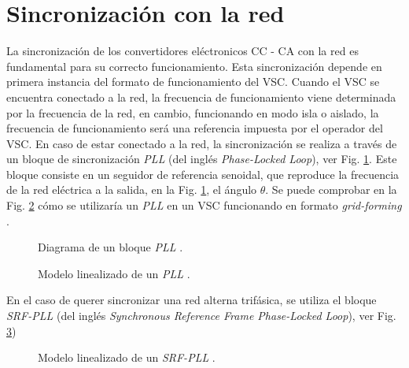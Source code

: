 \documentclass{report}
\begin{document}
\clearpage
\section{Sincronización con la red} \label{sec.sincronizacionconlared}

La sincronización de los convertidores eléctronicos CC - CA con la red es fundamental para su correcto funcionamiento. Esta sincronización depende en primera instancia del formato de funcionamiento del VSC. Cuando el VSC se encuentra conectado a la red, la frecuencia de funcionamiento viene determinada por la frecuencia de la red, en cambio, funcionando en modo isla o aislado, la frecuencia de funcionamiento será una referencia impuesta por el operador del VSC. En caso de estar conectado a la red, la sincronización se realiza a través de un bloque de sincronización \textit{PLL} \cite{dos} (del inglés \textit{Phase-Locked Loop}), ver Fig. \ref{fig.PLL}. Este bloque consiste en un seguidor de referencia senoidal, que reproduce la frecuencia de la red eléctrica a la salida, en la Fig. \ref{fig.PLL}, el ángulo $\theta$. Se puede comprobar en la Fig. \ref{fig.grid-forming-PLL} cómo se utilizaría un \textit{PLL} en un VSC funcionando en formato \textit{grid-forming} \cite{doce,treintaysiete}.


\begin{figure}[!h]
    \begin{center}
    \end{center}
    \caption{Diagrama de un bloque \textit{PLL} \cite{once}.}
    \label{fig.PLL}
    \end{figure}


\begin{figure}[!h]
    \begin{center}
        \end{center}
        \caption{Modelo linealizado de un \textit{PLL} \cite{doce}.}
        \label{fig.grid-forming-PLL}
        \end{figure}

    
En el caso de querer sincronizar una red alterna trifásica, se utiliza el bloque \textit{SRF-PLL} \cite{diez} (del inglés \textit{Synchronous Reference Frame Phase-Locked Loop}), ver Fig. \ref{fig.SRF-PLL}) 

\begin{figure}[!h]
    \begin{center}
    \end{center}
    \caption{Modelo linealizado de un \textit{SRF-PLL} \cite{diez}.}
    \label{fig.SRF-PLL}
    \end{figure}
\end{document}
